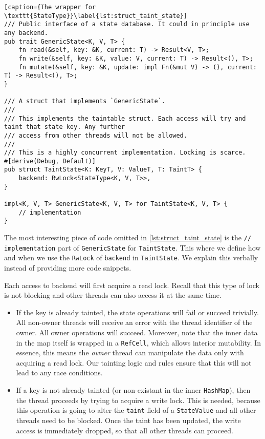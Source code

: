 \begin{lstlisting}[caption={The wrapper for \texttt{StateType}}\label{lst:struct_taint_state}]
/// Public interface of a state database. It could in principle use any backend.
pub trait GenericState<K, V, T> {
	fn read(&self, key: &K, current: T) -> Result<V, T>;
	fn write(&self, key: &K, value: V, current: T) -> Result<(), T>;
	fn mutate(&self, key: &K, update: impl Fn(&mut V) -> (), current: T) -> Result<(), T>;
}

/// A struct that implements `GenericState`.
///
/// This implements the taintable struct. Each access will try and taint that state key. Any further
/// access from other threads will not be allowed.
///
/// This is a highly concurrent implementation. Locking is scarce.
#[derive(Debug, Default)]
pub struct TaintState<K: KeyT, V: ValueT, T: TaintT> {
	backend: RwLock<StateType<K, V, T>>,
}

impl<K, V, T> GenericState<K, V, T> for TaintState<K, V, T> {
	// implementation
}
\end{lstlisting}

The most interesting piece of code omitted in \ref{lst:struct_taint_state} is the \texttt{//
implementation} part of \texttt{GenericState} for \texttt{TaintState}. This where we define how and
when we use the \texttt{RwLock} of \texttt{backend} in \texttt{TaintState}. We explain this verbally
instead of providing more code snippets.

Each access to backend will first acquire a read lock. Recall that this type of lock is not blocking
and other threads can also access it at the same time.

\begin{itemize}
	\item If the key is already tainted, the state operations will fail or succeed trivially. All
	non-owner threads will receive an error with the thread identifier of the owner. All owner
	operations will succeed. Moreover, note that the inner data in the map itself is wrapped in a
	\texttt{RefCell}, which allows interior mutability\cite{RefCellInteriorMutability}. In essence,
	this means the \textit{owner} thread can manipulate the data only with acquiring a read lock.
	Our tainting logic and rules ensure that this will not lead to any race conditions.
	\item If a key is not already tainted (or non-existant in the inner \texttt{HashMap}), then the
	thread proceeds by trying to acquire a write lock. This is needed, because this operation is
	going to alter the \texttt{taint} field of a \texttt{StateValue} and all other threads need to
	be blocked. Once the taint has been updated, the write access is immediately dropped, so that
	all other threads can proceed.
\end{itemize}

